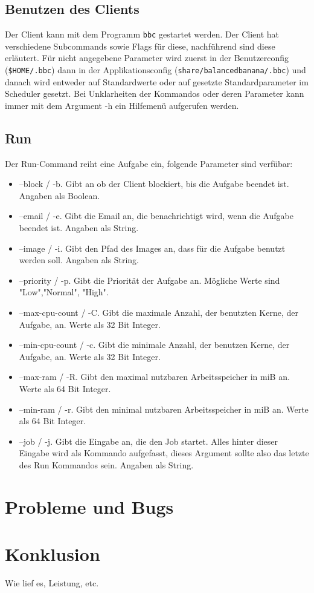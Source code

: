\documentclass[a4paper,12pt]{article}
\begin{document}
\subsection{Benutzen des Clients}
Der Client kann mit dem Programm \texttt{bbc} gestartet werden. Der Client hat verschiedene Subcommands sowie Flags für diese, nachführend sind diese erläutert. Für nicht angegebene Parameter wird zuerst in der Benutzerconfig (\texttt{\$HOME/.bbc}) dann in der Applikationsconfig (\texttt{share/balancedbanana/.bbc}) und danach wird entweder auf Standardwerte oder auf gesetzte Standardparameter im Scheduler gesetzt.
Bei Unklarheiten der Kommandos oder deren Parameter kann immer mit dem Argument -h ein Hilfemenü aufgerufen werden.
\subsection{Run}
Der Run-Command reiht eine Aufgabe ein, folgende Parameter sind verfübar:
\begin{itemize}
\item --block / -b. Gibt an ob der Client blockiert, bis die Aufgabe beendet ist. Angaben als Boolean.
\item --email / -e. Gibt die Email an, die benachrichtigt wird, wenn die Aufgabe beendet ist. Angaben als String.
\item --image / -i. Gibt den Pfad des Images an, dass für die Aufgabe benutzt werden soll.  Angaben als String.
\item --priority / -p. Gibt die Priorität der Aufgabe an. Mögliche Werte sind "Low","Normal", "High".
\item --max-cpu-count / -C. Gibt die maximale Anzahl, der benutzten Kerne, der Aufgabe, an. Werte als 32 Bit Integer.
\item --min-cpu-count / -c. Gibt die minimale Anzahl, der benutzen Kerne, der Aufgabe, an. Werte als 32 Bit Integer.
\item --max-ram / -R. Gibt den maximal nutzbaren Arbeitsspeicher in miB an. Werte als 64 Bit Integer.
\item --min-ram / -r. Gibt den minimal nutzbaren Arbeitsspeicher in miB an. Werte als 64 Bit Integer.
\item --job / -j. Gibt die Eingabe an, die den Job startet. Alles hinter dieser Eingabe wird als Kommando aufgefasst, dieses Argument sollte also das letzte des Run Kommandos sein. Angaben als String.
\end{itemize}
\section{Probleme und Bugs}
\section{Konklusion}

Wie lief es, Leistung, etc.
\clearpage
\end{document}
